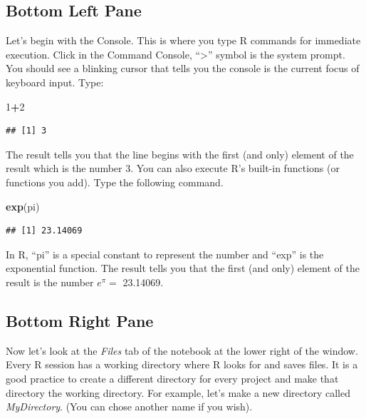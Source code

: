\documentclass[
]{book}
\newenvironment{Shaded}{\begin{snugshade}}{\end{snugshade}}
\newcommand{\DecValTok}[1]{\textcolor[rgb]{0.00,0.00,0.81}{#1}}
\newcommand{\KeywordTok}[1]{\textcolor[rgb]{0.13,0.29,0.53}{\textbf{#1}}}
\newcommand{\NormalTok}[1]{#1}
\newcommand{\OperatorTok}[1]{\textcolor[rgb]{0.81,0.36,0.00}{\textbf{#1}}}
\begin{document}
\hypertarget{bottom-left-pane}{%
\subsection*{Bottom Left Pane}\label{bottom-left-pane}}

Let's begin with the Console. This is where you type R commands for immediate execution. Click in the Command Console, ``\textgreater{}'' symbol is the system prompt. You should see a blinking cursor that tells you the console is the current focus of keyboard input. Type:

\begin{Shaded}
\begin{Highlighting}[]
\DecValTok{1}\OperatorTok{+}\DecValTok{2}
\end{Highlighting}
\end{Shaded}

\begin{verbatim}
## [1] 3
\end{verbatim}

The result tells you that the line begins with the first (and only) element of the result which is the number 3. You can also execute R's built-in functions (or functions you add). Type the following command.

\begin{Shaded}
\begin{Highlighting}[]
\KeywordTok{exp}\NormalTok{(pi)}
\end{Highlighting}
\end{Shaded}

\begin{verbatim}
## [1] 23.14069
\end{verbatim}

In R, ``pi'' is a special constant to represent the number and ``exp'' is the exponential function. The result tells you that the first (and only) element of the result is the number \(e^{\pi}=\) 23.14069.

\hypertarget{bottom-right-pane}{%
\subsection*{Bottom Right Pane}\label{bottom-right-pane}}

Now let's look at the \emph{Files} tab of the notebook at the lower right of the window. Every R session has a working directory where R looks for and saves files. It is a good practice to create a different directory for every project and make that directory the working directory. For example, let's make a new directory called \emph{MyDirectory}. (You can chose another name if you wish).
\end{document}
